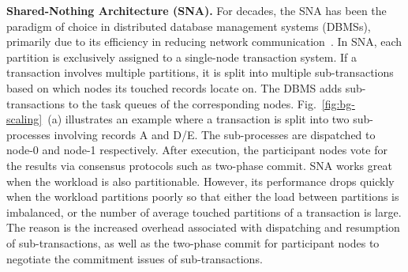 \noindent \textbf{Shared-Nothing Architecture (SNA).} For decades, the SNA has been the paradigm of choice in distributed database management systems (DBMSs), primarily due to its efficiency in reducing network communication~\cite{hstore_damon16, citus_sigmod21, memsql_vldb16, voltdb, calvin_sigmod12}. 
In SNA, each partition is exclusively assigned to a single-node transaction system. 
If a transaction involves multiple partitions, it is split into multiple sub-transactions based on which nodes its touched records locate on. The DBMS adds sub-transactions to the task queues of the corresponding nodes. Fig.~\ref{fig:bg-scaling}~(a) illustrates an example where a transaction is split into two sub-processes involving records A and D/E. The sub-processes are dispatched to node-0 and node-1 respectively. 
After execution, the participant nodes vote for the results via consensus protocols such as two-phase commit. 
SNA works great when the workload is also partitionable. 
However, its performance drops quickly when the workload partitions poorly so that either the load between partitions is imbalanced, or the number of average touched partitions of a transaction is large. The reason is the increased overhead associated with dispatching and resumption of sub-transactions, as well as the two-phase commit for participant nodes to negotiate the commitment issues of sub-transactions. 

